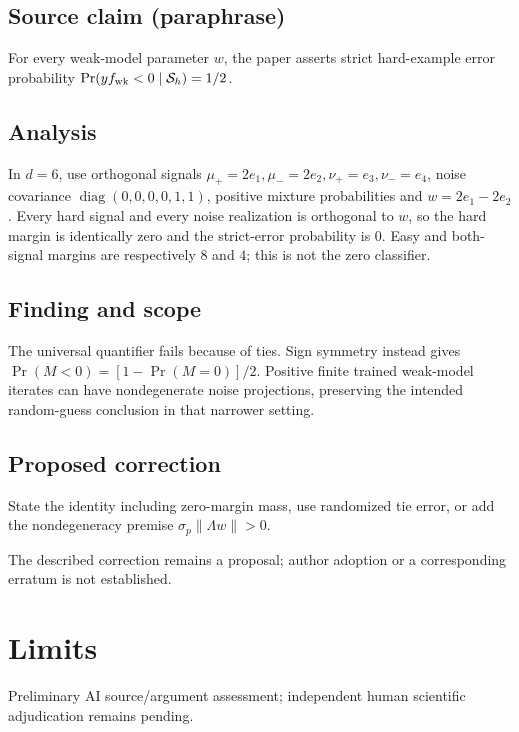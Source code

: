 \documentclass[11pt]{article}
\begin{document}
\subsection*{Source claim (paraphrase)}

For every weak-model parameter \(w\), the paper asserts strict hard-example error probability \(\Pr(yf_{\rm wk}<0\mid\mathcal S_h)=1/2\).

\subsection*{Analysis}

In \(d=6\), use orthogonal signals \(\mu_+=2e_1,\mu_-=2e_2,\nu_+=e_3,\nu_-=e_4\), noise covariance \(\operatorname{diag}(0,0,0,0,1,1)\), positive mixture probabilities and \(w=2e_1-2e_2\). Every hard signal and every noise realization is orthogonal to \(w\), so the hard margin is identically zero and the strict-error probability is \(0\). Easy and both-signal margins are respectively \(8\) and \(4\); this is not the zero classifier.

\subsection*{Finding and scope}

The universal quantifier fails because of ties. Sign symmetry instead gives \(\Pr(M<0)=[1-\Pr(M=0)]/2\). Positive finite trained weak-model iterates can have nondegenerate noise projections, preserving the intended random-guess conclusion in that narrower setting.

\subsection*{Proposed correction}

State the identity including zero-margin mass, use randomized tie error, or add the nondegeneracy premise \(\sigma_p\|\Lambda w\|>0\).

The described correction remains a proposal; author adoption or a corresponding erratum is not established.

\section*{Limits}

Preliminary AI source/argument assessment; independent human scientific adjudication remains pending.\par
\end{document}
